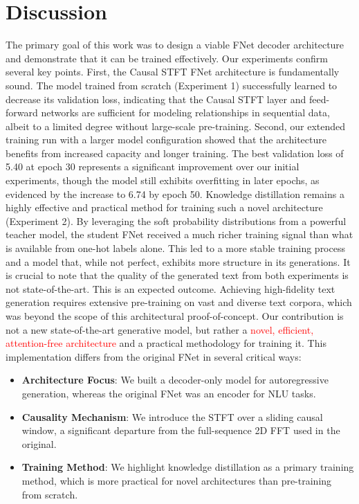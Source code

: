 \documentclass[11pt,a4paper]{article}
\begin{document}
\section{Discussion}
The primary goal of this work was to design a viable FNet decoder architecture and demonstrate that it can be trained effectively. Our experiments confirm several key points.
First, the Causal STFT FNet architecture is fundamentally sound. The model trained from scratch (Experiment 1) successfully learned to decrease its validation loss, indicating that the Causal STFT layer and feed-forward networks are sufficient for modeling relationships in sequential data, albeit to a limited degree without large-scale pre-training. Second, our extended training run with a larger model configuration showed that the architecture benefits from increased capacity and longer training. The best validation loss of 5.40 at epoch 30 represents a significant improvement over our initial experiments, though the model still exhibits overfitting in later epochs, as evidenced by the increase to 6.74 by epoch 50. Knowledge distillation remains a highly effective and practical method for training such a novel architecture (Experiment 2). By leveraging the soft probability distributions from a powerful teacher model, the student FNet received a much richer training signal than what is available from one-hot labels alone. This led to a more stable training process and a model that, while not perfect, exhibits more structure in its generations.
It is crucial to note that the quality of the generated text from both experiments is not state-of-the-art. This is an expected outcome. Achieving high-fidelity text generation requires extensive pre-training on vast and diverse text corpora, which was beyond the scope of this architectural proof-of-concept. Our contribution is not a new state-of-the-art generative model, but rather a \textcolor{red}{novel, efficient, attention-free architecture} and a practical methodology for training it.
This implementation differs from the original FNet in several critical ways:
\begin{itemize}
\item \textbf{Architecture Focus}: We built a decoder-only model for autoregressive generation, whereas the original FNet was an encoder for NLU tasks.
\item \textbf{Causality Mechanism}: We introduce the STFT over a sliding causal window, a significant departure from the full-sequence 2D FFT used in the original.
\item \textbf{Training Method}: We highlight knowledge distillation as a primary training method, which is more practical for novel architectures than pre-training from scratch.
\end{itemize}
\end{document}
